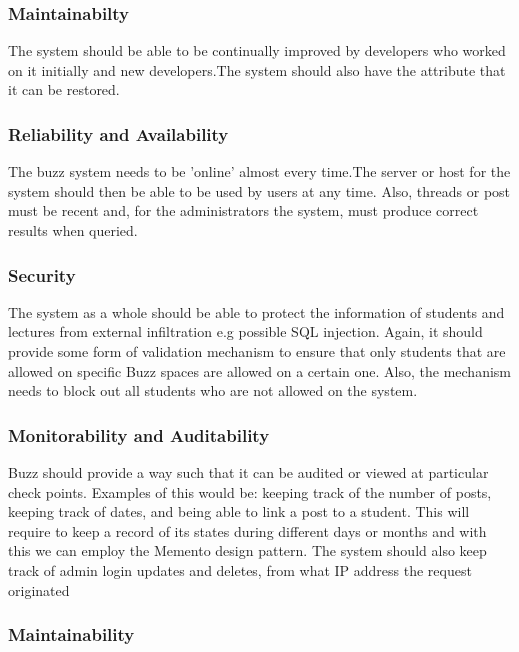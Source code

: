 \documentclass[10pt]{article}
\begin{document}
\subsubsection{Maintainabilty}

The system should be able to be continually improved by developers who worked on it initially and new developers.The system should also have the attribute that it can be restored.

\subsubsection{Reliability and Availability}

The buzz system needs to be 'online' almost every time.The server or host for the system should then be able to be used by users at any time. Also, threads or post must be recent and, for the administrators the system, must produce correct results when queried.


\subsubsection{Security}

The system as a whole should be able to protect the information of students and lectures from external infiltration e.g possible SQL injection. Again, it should provide some form of validation mechanism to ensure that only students that are allowed on specific Buzz spaces are allowed on a certain one. Also, the mechanism needs to block out all students who are not allowed on the system.

\subsubsection{Monitorability and Auditability}

Buzz should provide a way such that it can be audited or viewed at particular check points. Examples of this would be: keeping track of the number
of posts, keeping track of dates, and being able to link a post to a student. This will require to keep a record of its states during different days or months and with this we can employ the Memento design pattern. The system should also keep track of admin login updates and deletes, from what IP address the request originated

\subsubsection{Maintainability}
\end{document}

